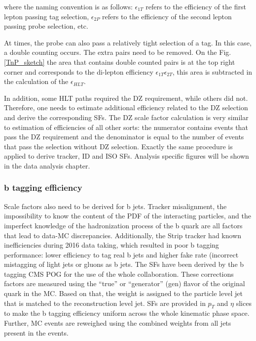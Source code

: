 \noindent where the naming convention is as follows: $\epsilon_{1T}$ refers to the efficiency of the first lepton passing tag selection, $\epsilon_{2P}$ refers to the efficiency of the second lepton passing probe selection, etc. 

At times, the probe can also pass a relatively tight selection of a tag. In this case, a double counting occurs. The extra pairs need to be removed. On the Fig. \ref{TnP_sketch} the area that contains double counted pairs is at the top right corner and corresponds to the di-lepton efficiency $\epsilon_{1T}\epsilon_{2T}$, this area is subtracted in the calculation of the $\epsilon_{HLT}$.

In addition, some HLT paths required the DZ requirement, while others did not. Therefore, one needs to estimate additional efficiency related to the DZ selection and derive the corresponding SFs. The DZ scale factor calculation is very similar to estimation of efficiencies of all other sorts: the numerator contains events that pass the DZ requirement and the denominator is equal to the number of events that pass the selection without DZ selection. Exactly the same procedure is applied to derive tracker, ID and ISO SFs. Analysis specific figures will be shown in the data analysis chapter. 

\subsubsection{b tagging efficiency}\label{sec:b_tagging}

Scale factors also need to be derived for b jets. Tracker misalignment, the impossibility to know the content of the PDF of the interacting particles, and the imperfect knowledge of the hadronization process of the b quark are all factors that lead to data-MC discrepancies. Additionally, the Strip tracker had known inefficiencies during 2016 data taking, which resulted in poor b tagging performance: lower efficiency to tag real b jets and higher fake rate (incorrect mistagging of light jets or gluons as b jets. The SFs have been derived by the b tagging CMS POG for the use of the whole collaboration. These corrections factors are measured using the ``true'' or ``generator'' (gen) flavor of the original quark in the MC. Based on that, the weight is assigned to the particle level jet that is matched to the reconstruction level jet. SFs are provided in $p_T$ and $\eta$ slices to make the b tagging efficiency uniform across the whole kinematic phase space. Further, MC events are reweighed using the combined weights from all jets present in the events. 

